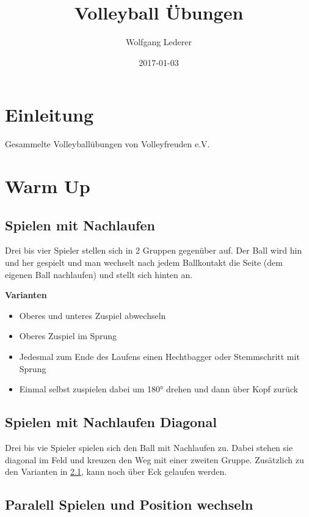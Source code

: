 \documentclass[]{book}
\title{Volleyball Übungen}
\author{Wolfgang Lederer}
\date{2017-01-03}
\providecommand{\tightlist}{%
  \setlength{\itemsep}{0pt}\setlength{\parskip}{0pt}}
\begin{document}
\maketitle

{
\setcounter{tocdepth}{1}
\tableofcontents
}
\chapter{Einleitung}\label{einleitung}

Gesammelte Volleyballübungen von Volleyfreuden e.V.

\chapter{Warm Up}\label{warm-up}

\section{Spielen mit Nachlaufen}\label{spielen-mit-nachlaufen}

Drei bis vier Spieler stellen sich in 2 Gruppen gegenüber auf. Der Ball
wird hin und her gespielt und man wechselt nach jedem Ballkontakt die
Seite (dem eigenen Ball nachlaufen) und stellt sich hinten an.

\textbf{Varianten}

\begin{itemize}
\tightlist
\item
  Oberes und unteres Zuspiel abwechseln
\item
  Oberes Zuspiel im Sprung
\item
  Jedesmal zum Ende des Laufens einen Hechtbagger oder Stemmschritt mit
  Sprung
\item
  Einmal selbst zuspielen dabei um 180° drehen und dann über Kopf zurück
\end{itemize}

\section{Spielen mit Nachlaufen
Diagonal}\label{spielen-mit-nachlaufen-diagonal}

Drei bis vie Spieler spielen sich den Ball mit Nachlaufen zu. Dabei
stehen sie diagonal im Feld und kreuzen den Weg mit einer zweiten
Gruppe. Zusätzlich zu den Varianten in \ref{spielen-mit-nachlaufen},
kann noch über Eck gelaufen werden.

\section{Paralell Spielen und Position
wechseln}\label{paralell-spielen-und-position-wechseln}
\end{document}
